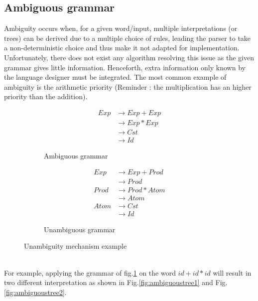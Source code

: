 \documentclass[a4paper,11pt]{article}
\begin{document}
  \subsection{Ambiguous grammar}
    \label{sec:ambiguity}
    Ambiguity occurs when, for a given word/input, multiple interpretations (or trees) can be derived due to a multiple choice of rules, leading the parser to take a non-deterministic choice and thus make it not adapted for implementation. Unfortunately, there does not exist any algorithm resolving this issue as the given grammar gives little information. Henceforth, extra information only known by the language designer must be integrated. The most common example of ambiguity is the arithmetic priority (Reminder : the multiplication has an higher priority than the addition).
      \begin{figure}[h!]
	\centering
	\begin{subfigure}[b]{0.4\textwidth}
	    \centering
	    \begin{align}
	      Exp &\rightarrow Exp+Exp \\
		  &\rightarrow Exp*Exp \\
		  &\rightarrow Cst \\
		  &\rightarrow Id
	    \end{align}
	    \caption{Ambiguous grammar}
	    \label{fig:unmodifiedgrammar3}
	\end{subfigure}%
	\begin{subfigure}[b]{0.4\textwidth}
	    \centering
	    \begin{align}
	      Exp  &\rightarrow Exp+Prod \\
		    &\rightarrow Prod \\
	      Prod &\rightarrow Prod*Atom \\
		    &\rightarrow Atom \\
	      Atom &\rightarrow Cst \\
		    &\rightarrow Id
	    \end{align}
	    \caption{Unambiguous grammar}
	    \label{fig:unambiguousgrammar3}
	\end{subfigure}
	\caption{Unambiguity mechanism example}
    \end{figure}\\
    For example, applying the grammar of fig.\ref{fig:unmodifiedgrammar3} on the word $id+id*id$ will result in two different interpretation as shown in Fig.\ref{fig:ambiguoustree1} and Fig.\ref{fig:ambiguoustree2}.\\
\end{document}
